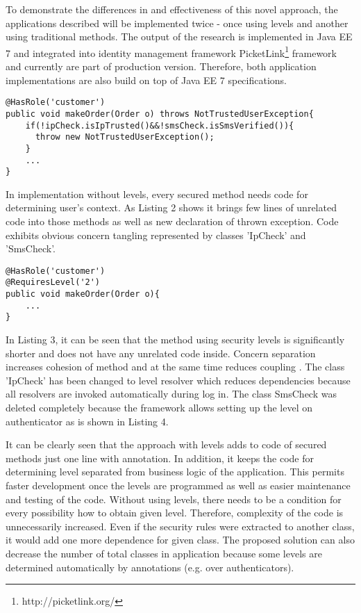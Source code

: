 \documentclass{sig-alternate}
\begin{document}
To demonstrate the differences in and effectiveness of this novel approach, the applications described will be implemented twice - once using levels and another using traditional methods. The output of the research is implemented in Java EE 7 and integrated into identity management framework PicketLink\footnote{http://picketlink.org/} framework and currently are part of production version. Therefore, both application implementations are also build on top of Java EE 7 specifications.

\begin{lstlisting}[]
@HasRole('customer')
public void makeOrder(Order o) throws NotTrustedUserException{
    if(!ipCheck.isIpTrusted()&&!smsCheck.isSmsVerified()){
      throw new NotTrustedUserException();
    }
    ...
}          
\end{lstlisting}

In implementation without levels, every secured method needs code for determining user's context. As Listing 2 shows it brings few lines of unrelated code into those methods as well as new declaration of thrown exception. Code exhibits obvious concern tangling \cite{concernSeparation} represented by classes 'IpCheck' and 'SmsCheck'.

\begin{lstlisting}[]
@HasRole('customer')
@RequiresLevel('2')
public void makeOrder(Order o){
    ...
}          
\end{lstlisting}

In Listing 3, it can be seen that the method using security levels is significantly shorter and does not have any unrelated code inside. Concern separation \cite{concernSeparation} increases cohesion \cite{cohesionCoupling} of method and at the same time reduces coupling \cite{cohesionCoupling}. The class 'IpCheck' has been changed to level resolver which reduces dependencies because all resolvers are invoked automatically during log in. The class SmsCheck was deleted completely because the framework allows setting up the level on authenticator as is shown in Listing 4.

It can be clearly seen that the approach with levels adds to code of secured methods just one line with annotation. In addition, it keeps the code for determining level separated from business logic of the application. This permits faster development once the levels are programmed as well as easier maintenance and testing of the code. Without using levels, there needs to be a condition for every possibility how to obtain given level. Therefore, complexity of the code is unnecessarily increased. Even if the security rules were extracted to another class, it would add one more dependence for given class. The proposed solution can also decrease the number of total classes in application because some levels are determined automatically by annotations (e.g. over authenticators).
\end{document}
